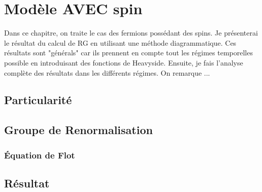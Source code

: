 \chapter{Modèle AVEC spin}
\begin{Abstract}
    \begin{changemargin}{2cm}{2cm}
    Dans ce chapitre, on traite le cas des fermions possédant des spins. Je présenterai le résultat du calcul de RG en utilisant une méthode diagrammatique. Ces résultats sont "générals" car ils prennent en compte tout les régimes temporelles possible en introduisant des fonctions de Heavyside. Ensuite, je fais l'analyse complète des résultats dans les différents régimes. On remarque ...
    \end{changemargin}
\end{Abstract}
\section{Particularité}

\section{Groupe de Renormalisation}
\subsection{Équation de Flot}

\section{Résultat}

